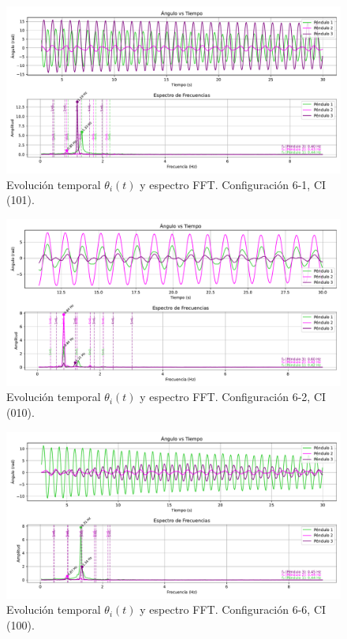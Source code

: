 \begin{figure}[htbp!]
    \centering
    \includegraphics[width=0.8\linewidth]{./Figures/101_16_filtrado.pdf}
    \caption{Evoluci\'on temporal $\theta_i(t)$ y espectro FFT.
        Configuraci\'on 6-1, CI (101).}
    \label{fig:101-61}
\end{figure}

\begin{figure}[htbp!]
    \centering
    \includegraphics[width=0.8\linewidth]{./Figures/010_26_filtrado.pdf}
    \caption{Evoluci\'on temporal $\theta_i(t)$ y espectro FFT.
        Configuraci\'on 6-2, CI (010).}
    \label{fig:010-62}
\end{figure}

\begin{figure}[htbp!]
    \centering
    \includegraphics[width=0.8\linewidth]{./Figures/001_66_filtrado.pdf}
    \caption{Evoluci\'on temporal $\theta_i(t)$ y espectro FFT.
        Configuraci\'on 6-6, CI (100).}
    \label{fig:100-66}
\end{figure}

